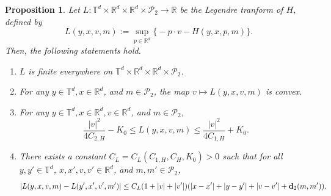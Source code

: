 \documentclass[reqno,11pt]{amsart}
\newtheorem{proposition}[theorem]{Proposition}
\numberwithin{equation}{section}
\newcommand{\R}{\mathbb{R}} %
\newcommand{\T}{\mathbb{T}}
\begin{document}
\begin{proposition}\label{prop:Lmprop}
 Let $L:\T^d\times \R^d \times \R^d \times \mathcal{P}_2\rightarrow \mathbb{R}$ be the Legendre tranform of $H$, defined by
\[
L(y,x,v,m) := \sup_{p \in \R^d} \big\{ -p \cdot v - H(y,x,p,m) \big\}.
\]
Then, the following statements hold.
\begin{enumerate}
    \item[$\rm{(1)}$] \(L\) is finite everywhere on \(\T^d\times \R^d \times \R^d \times \mathcal{P}_2 \).
    \item[$\rm{(2)}$] For any \(y \in \mathbb{T}^d, x \in \R^d\), and \(m \in \mathcal{P}_2\), the map \(v \mapsto L(y,x,v, m)\) is convex.
    \item[$\rm{(3)}$] For any \(y \in \mathbb{T}^d, x\in \R^d ,v \in \mathbb{R}^d\), and \(m \in \mathcal{P}_2\),
    \begin{equation}\label{eqn:Lmquad}
    \frac{|v|^2}{4C_{2,H}} -K_0 \leq L(y,x, v, m) \leq \frac{|v|^2}{4C_{1,H}} +K_0.       \end{equation}

    \item[$\rm{(4)}$] There exists a constant $C_L=C_L(C_{1,H},C_H,K_0)>0$ such that for all
    $y,y'\in \T^d$, $x,x', v,v'\in \R^d$, and $m,m'\in \mathcal{P}_2$,
    \begin{equation}\label{eqn:LmLip}
    |L(y,x,v,m)-L(y',x',v',m')|\le C_L(1+|v|+|v'|)(|x-x'|+|y-y'|+|v-v'|+{\bf d}_2(m,m')).
    \end{equation}
\end{enumerate}
\end{proposition}
\end{document}
